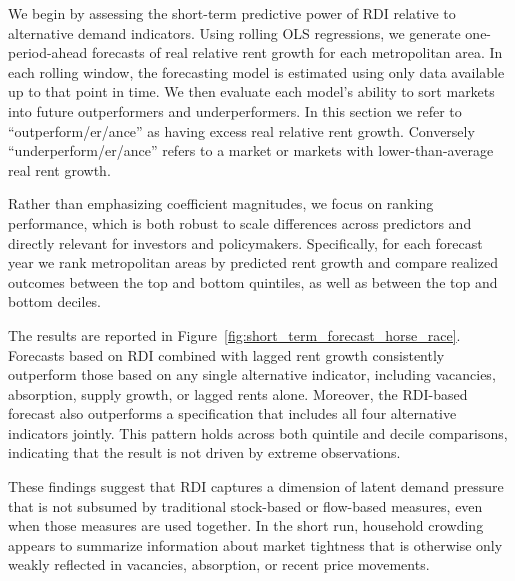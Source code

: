 \documentclass[pdflatex,sn-apa]{sn-jnl}%
\theoremstyle{thmstyleone}%
\theoremstyle{thmstyletwo}%
\theoremstyle{thmstylethree}%
\begin{document}
We begin by assessing the short-term predictive power of RDI relative to alternative demand indicators. Using rolling OLS regressions, we generate one-period-ahead forecasts of real relative rent growth for each metropolitan area. In each rolling window, the forecasting model is estimated using only data available up to that point in time. We then evaluate each model’s ability to sort markets into future outperformers and underperformers. In this section we refer to  ``outperform/er/ance'' as having excess real relative rent growth. Conversely ``underperform/er/ance'' refers to a market or markets with lower-than-average real rent growth. 

Rather than emphasizing coefficient magnitudes, we focus on ranking performance, which is both robust to scale differences across predictors and directly relevant for investors and policymakers. Specifically, for each forecast year we rank metropolitan areas by predicted rent growth and compare realized outcomes between the top and bottom quintiles, as well as between the top and bottom deciles.

The results are reported in Figure~\ref{fig:short_term_forecast_horse_race}. Forecasts based on RDI combined with lagged rent growth consistently outperform those based on any single alternative indicator, including vacancies, absorption, supply growth, or lagged rents alone. Moreover, the RDI-based forecast also outperforms a specification that includes all four alternative indicators jointly. This pattern holds across both quintile and decile comparisons, indicating that the result is not driven by extreme observations.

These findings suggest that RDI captures a dimension of latent demand pressure that is not subsumed by traditional stock-based or flow-based measures, even when those measures are used together. In the short run, household crowding appears to summarize information about market tightness that is otherwise only weakly reflected in vacancies, absorption, or recent price movements.
\end{document}
